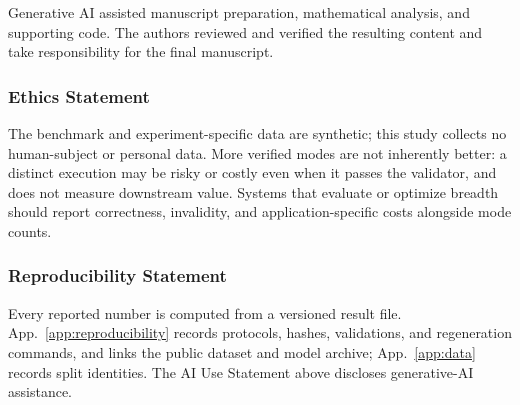 Generative AI assisted manuscript preparation, mathematical analysis, and supporting code. The authors reviewed and verified the resulting content and take responsibility for the final manuscript.

\subsubsection*{Ethics Statement}

The benchmark and experiment-specific data are synthetic; this study collects
no human-subject or personal data. More verified modes are not inherently
better: a distinct execution may be risky or costly even when it passes the
validator, and \pmd{} does not measure downstream value. Systems
that evaluate or optimize breadth should report correctness, invalidity, and
application-specific costs alongside mode counts.

\subsubsection*{Reproducibility Statement}

Every reported number is computed from a versioned result file.
App.~\ref{app:reproducibility} records protocols, hashes, validations,
and regeneration commands, and links the public dataset and model archive;
App.~\ref{app:data} records split identities.
The AI Use Statement above discloses generative-AI assistance.

